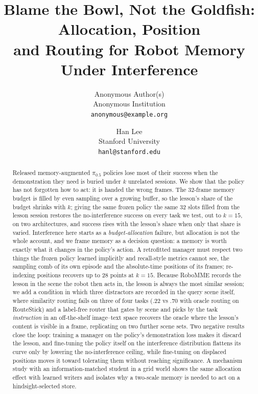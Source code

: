 \documentclass{article}
\title{Blame the Bowl, Not the Goldfish: Allocation, Position\\and Routing for Robot Memory Under Interference}
\author{Anonymous Author(s)\\Anonymous Institution\\\texttt{anonymous@example.org}}
\author{Han Lee\\Stanford University\\\texttt{hanl@stanford.edu}}
\begin{document}
\maketitle


\begin{abstract}
Released memory-augmented $\pi_{0.5}$ policies lose most of their success when the demonstration they need is buried under $k$ unrelated sessions. We show that the policy has not forgotten how to act: it is handed the wrong frames. The 32-frame memory budget is filled by even sampling over a growing buffer, so the lesson's share of the budget shrinks with $k$; giving the same frozen policy the same 32 slots filled from the lesson session restores the no-interference success on every task we test, out to $k{=}15$, on two architectures, and success rises with the lesson's share when only that share is varied. Interference here starts as a \emph{budget-allocation} failure, but allocation is not the whole account, and we frame memory as a decision question: a memory is worth exactly what it changes in the policy's action. A retrofitted manager must respect two things the frozen policy learned implicitly and recall-style metrics cannot see, the sampling comb of its own episode and the absolute-time positions of its frames; re-indexing positions recovers up to 28 points at $k{=}15$. Because RoboMME records the lesson in the scene the robot then acts in, the lesson is always the most similar session; we add a condition in which three distractors are recorded in the query scene itself, where similarity routing fails on three of four tasks ($.22$ vs $.70$ with oracle routing on RouteStick) and a label-free router that gates by scene and picks by the task \emph{instruction} in an off-the-shelf image--text space recovers the oracle where the lesson's content is visible in a frame, replicating on two further scene sets. Two negative results close the loop: training a manager on the policy's demonstration loss makes it discard the lesson, and fine-tuning the policy itself on the interference distribution flattens its curve only by lowering the no-interference ceiling, while fine-tuning on displaced positions moves it toward tolerating them without reaching significance. A mechanism study with an information-matched student in a grid world shows the same allocation effect with learned writers and isolates why a two-scale memory is needed to act on a hindsight-selected store.
\end{abstract}
\end{document}

